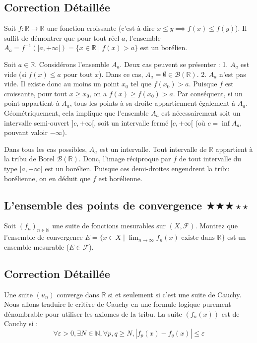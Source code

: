 \documentclass[11pt,a4paper]{article}
\begin{document}
\subsection*{Correction Détaillée}

Soit $f : \mathbb{R} \to \mathbb{R}$ une fonction croissante (c'est-à-dire $x \leq y \implies f(x) \leq f(y)$).
Il suffit de démontrer que pour tout réel $a$, l'ensemble $A_a = f^{-1}(]a, +\infty[) = \{x \in \mathbb{R} \mid f(x) > a\}$ est un borélien.

Soit $a \in \mathbb{R}$. Considérons l'ensemble $A_a$.
Deux cas peuvent se présenter :
1. $A_a$ est vide (si $f(x) \leq a$ pour tout $x$). Dans ce cas, $A_a = \emptyset \in \mathcal{B}(\mathbb{R})$.
2. $A_a$ n'est pas vide. Il existe donc au moins un point $x_0$ tel que $f(x_0) > a$.
   Puisque $f$ est croissante, pour tout $x \geq x_0$, on a $f(x) \geq f(x_0) > a$.
   Par conséquent, si un point appartient à $A_a$, tous les points à sa droite appartiennent également à $A_a$.
   Géométriquement, cela implique que l'ensemble $A_a$ est nécessairement soit un intervalle semi-ouvert $]c, +\infty[$, soit un intervalle fermé $[c, +\infty[$ (où $c = \inf A_a$, pouvant valoir $-\infty$).

Dans tous les cas possibles, $A_a$ est un intervalle.
Tout intervalle de $\mathbb{R}$ appartient à la tribu de Borel $\mathcal{B}(\mathbb{R})$.
Donc, l'image réciproque par $f$ de tout intervalle du type $]a, +\infty[$ est un borélien.
Puisque ces demi-droites engendrent la tribu borélienne, on en déduit que $f$ est borélienne.


\vspace{0.5cm}

\subsection*{L'ensemble des points de convergence \quad $\bigstar\bigstar\bigstar\star\star$}

Soit $(f_n)_{n \in \mathbb{N}}$ une suite de fonctions mesurables sur $(X, \mathcal{F})$.
Montrez que l'ensemble de convergence $E = \{x \in X \mid \lim_{n \to \infty} f_n(x) \text{ existe dans } \mathbb{R}\}$ est un ensemble mesurable ($E \in \mathcal{F}$).

\subsection*{Correction Détaillée}

Une suite $(u_n)$ converge dans $\mathbb{R}$ si et seulement si c'est une suite de Cauchy.
Nous allons traduire le critère de Cauchy en une formule logique purement dénombrable pour utiliser les axiomes de la tribu.
La suite $(f_n(x))$ est de Cauchy si :
$$ \forall \varepsilon > 0, \exists N \in \mathbb{N}, \forall p, q \ge N, |f_p(x) - f_q(x)| \le \varepsilon $$
\end{document}
